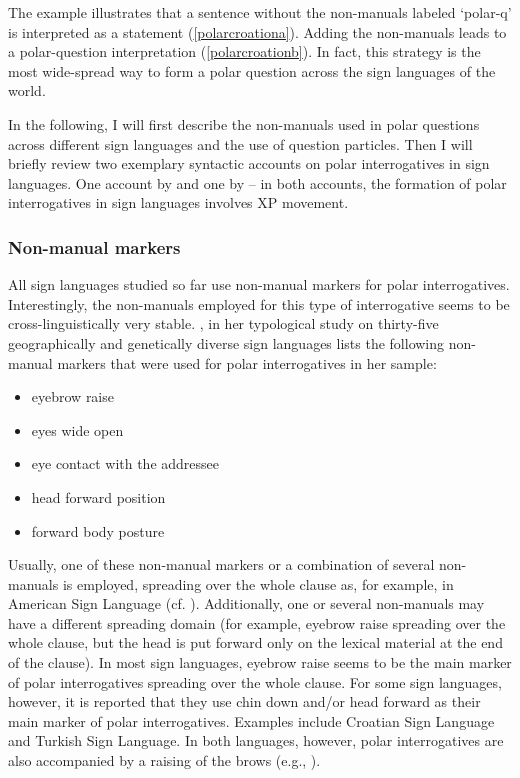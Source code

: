 \noindent The example illustrates that a sentence without the non-manuals labeled `polar-q' is interpreted as a statement (\ref{polarcroationa}). Adding the non-manuals leads to a polar-question interpretation (\ref{polarcroationb}). In fact, this strategy is the most wide-spread way to form a polar question across the sign languages of the world.

In the following, I will first describe the non-manuals used in polar questions across different sign languages and the use of question particles. Then I will briefly review two exemplary syntactic accounts on polar interrogatives in sign languages. One account by \citet{sarac2006interrogative} and one by \citet{aboh2010sa} -- in both accounts, the formation of polar interrogatives in sign languages involves XP movement.

\subsubsection{Non-manual markers}
All\label{nnmpolarintsign} sign languages studied so far use non-manual markers for polar interrogatives. Interestingly, the non-manuals employed for this type of interrogative seems to be cross-linguistically very stable. \citet[19]{zeshan2004interrogative}, in her typological study on thirty-five geographically and genetically diverse sign languages lists the following non-manual markers that were used for polar interrogatives in her sample:

\begin{itemize}[itemsep=0pt]
	\item eyebrow raise
	\item eyes wide open
	\item eye contact with the addressee
	\item head forward position
	\item forward body posture
\end{itemize}

\noindent Usually, one of these non-manual markers or a combination of several non-man\-uals is employed, spreading over the whole clause as, for example, in American Sign Language (cf. \citealt{wilbur1999syntactic}). Additionally, one or several non-manuals may have a different spreading domain (for example, eyebrow raise spreading over the whole clause, but the head is put forward only on the lexical material at the end of the clause). In most sign languages, eyebrow raise seems to be the main marker of polar interrogatives spreading over the whole clause. For some sign languages, however, it is reported that they use chin down and/or head forward as their main marker of polar interrogatives. Examples include Croatian Sign Language and Turkish Sign Language. In both languages, however, polar interrogatives are also accompanied by a raising of the brows (e.g., \citealt{sarac2006interrogative}).

